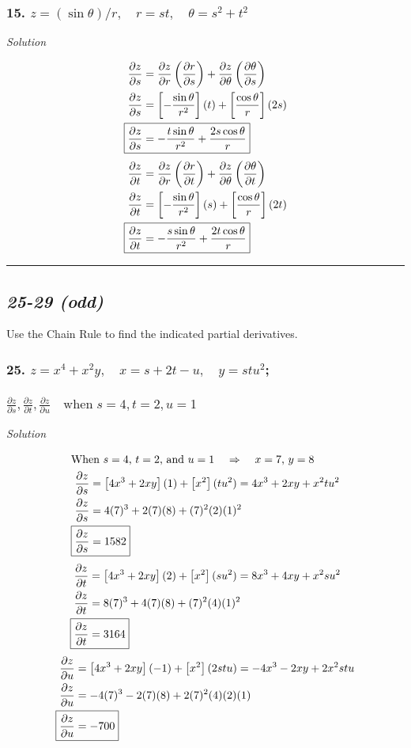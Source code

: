 \documentclass{article}
\newcommand\rr{\quad\Rightarrow\quad}
\newcommand{\solution}{\centerline{\textit{Solution}}}
\newcommand{\pp}[2]{\displaystyle\frac{\partial #1}{\partial #2}}
\newcommand{\spc}{\vspace{1em}\hrule\vspace{1em}}
\newcommand{\bp}[1]{\left(#1\right)}
\newcommand{\bb}[1]{\left[#1\right]}
\begin{document}
\subsubsection*{15. $z=(\sin\theta)/r,\quad r=st,\quad\theta = s^2 + t^2$}
\solution
\begin{align*}
    \pp z s &= \pp z r \bp{\pp r s} + \pp z \theta\bp{\pp \theta s} \\
    \pp z s &= \bb{-\displaystyle\frac{\sin\theta}{r^2}}(t) +
    \bb{\displaystyle\frac{\cos\theta}{r}}(2s) \\
    \Aboxed{\pp z s &= -\displaystyle\frac{t\sin\theta}{r^2} +
    \displaystyle\frac{2s\cos\theta}{r}}
\end{align*}
\begin{align*}
    \pp z t &= \pp z r \bp{\pp r t} + \pp z \theta \bp{\pp \theta t} \\
    \pp z t &=
    \bb{-\displaystyle\frac{\sin\theta}{r^2}}(s)+\bb{\displaystyle\frac{\cos\theta}{r}}(2t)
    \\
    \Aboxed{\pp z t &= -\displaystyle\frac{s\sin\theta}{r^2}+
    \displaystyle\frac{2t\cos\theta}{r}}
\end{align*}
\spc
\begin{center}
\subsection*{\textit{25-29 (odd)}}
Use the Chain Rule to find the indicated partial derivatives.
\end{center}
\subsubsection*{
    25.
    $z = x^4 + x^2y,\quad x = s+2t-u,\quad y =stu^2$;\\\\
    $\pp z s, \pp z t, \pp z u\quad \text{when}\;s=4,t=2,u=1$
}
\solution
\begin{align*}
    \intertext{When $s = 4$, $t=2$, and $u=1$ $\rr$ $x=7$, $y=8$}
    \pp z s &= \bb{4x^3 +2xy}(1) + \bb{x^2}(tu^2) = 4x^3 + 2xy + x^2tu^2 \\
    \pp z s &= 4(7)^3 + 2(7)(8) + (7)^2(2)(1)^2 \\
    \Aboxed{\pp z s &= 1582}
\end{align*}
\begin{align*}
    \pp z t &= \bb{4x^3+2xy}(2)+\bb{x^2}(su^2) = 8x^3+4xy+x^2su^2 \\
    \pp z t &= 8(7)^3+4(7)(8)+(7)^2(4)(1)^2 \\
    \Aboxed{\pp z t &= 3164}
\end{align*}
\begin{align*}
    \pp z u &= \bb{4x^3+2xy}(-1)+\bb{x^2}(2stu) = -4x^3-2xy+2x^2stu \\
    \pp z u &= -4(7)^3-2(7)(8)+2(7)^2(4)(2)(1) \\
    \Aboxed{\pp z u &= -700}
\end{align*}
\end{document}
